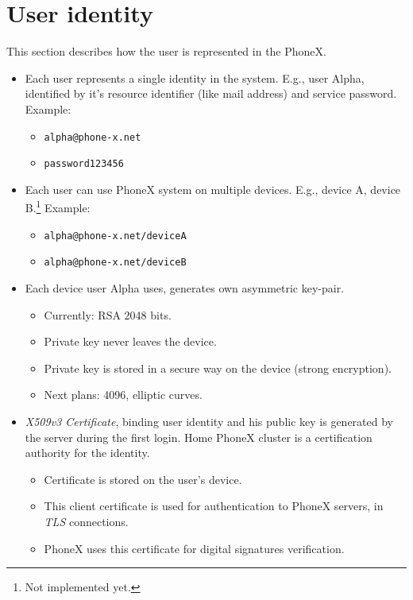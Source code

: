 \documentclass[a4paper,10pt]{article}
\begin{document}
\section{User identity}\label{sec:identity}
This section describes how the user is represented in the PhoneX.
\begin{itemize}
 \item Each user represents a single identity in the system. E.g., user Alpha, identified by it's resource identifier (like mail address) and service password. Example:
\begin{itemize}
 \item \verb|alpha@phone-x.net|
 \item \verb|password123456|
\end{itemize}
 \item Each user can use PhoneX system on multiple devices. E.g., device A, device B.\footnote{Not implemented yet.} Example:
\begin{itemize}
 \item \verb|alpha@phone-x.net/deviceA|
 \item \verb|alpha@phone-x.net/deviceB|
\end{itemize}
 \item Each device user Alpha uses, generates own asymmetric key-pair. 
\begin{itemize}
 \item Currently: RSA 2048 bits.
 \item Private key never leaves the device.
 \item Private key is stored in a secure way on the device (strong encryption).
 \item Next plans: 4096, elliptic curves.
\end{itemize}
 \item \emph{X509v3 Certificate}, binding user identity and his public key is generated by the server during the first login. Home PhoneX cluster is a certification 
authority for the identity.
\begin{itemize}
 \item Certificate is stored on the user's device.
 \item This client certificate is used for authentication to PhoneX servers, in \emph{TLS} connections.
 \item PhoneX uses this certificate for digital signatures verification.
\end{itemize}
\end{itemize}
\end{document}
